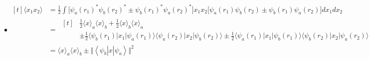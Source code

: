\documentclass[12pt]{article}
\begin{document}
\vspace{5pt}
\hspace{.5cm} 

\vspace{10pt} \noindent
\(\bullet \ \begin{aligned}[t]
    \langle x_1 x_2 \rangle &= \frac{1}{2} \int \Big[ \psi_a(r_1)^* \psi_b(r_2)^* 
        \pm \psi_b(r_1)^* \psi_a(r_2)^* \Big] x_1 x_2 \Big[ \psi_a(r_1) \psi_b(r_2) 
        \pm \psi_b(r_1) \psi_a(r_2) \Big] dx_1 dx_2\\[5pt]
    &= \ \begin{aligned}[t]
            &   \frac{1}{2} \langle x \rangle_a \langle x \rangle_b +
                \frac{1}{2} \langle x \rangle_b \langle x \rangle_a \\[5pt]
            &\pm \frac{1}{2} \Big\langle \psi_b(r_1) \Big| x_1 \Big| \psi_a(r_1) \Big\rangle 
                \Big\langle \psi_a(r_2) \Big| x_2 \Big| \psi_b(r_2) \Big\rangle \pm \frac{1}{2} 
                \Big\langle \psi_a(r_1) \Big| x_1 \Big| \psi_b(r_1) \Big\rangle
                \Big\langle \psi_b(r_2) \Big| x_2 \Big| \psi_a(r_2) \Big\rangle
        \end{aligned}\\[10pt]
    &= \langle x \rangle_a \langle x \rangle_b \pm
    \big\Vert \left\langle \psi_b \right| x \left| \psi_a \right\rangle \big\Vert^2
\end{aligned}\)
\end{document}
